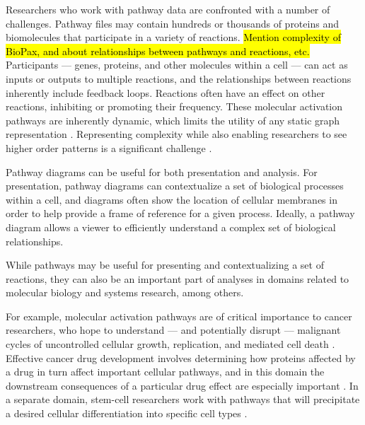 
Researchers who work with pathway data are confronted with a number of challenges.
Pathway files may contain hundreds or thousands of proteins and biomolecules that participate in a variety of reactions.
\hl{Mention complexity of BioPax, and about relationships between pathways and reactions, etc.}
Participants --- genes, proteins, and other molecules within a cell --- can act as inputs or outputs to multiple reactions, and the relationships between reactions inherently include feedback loops.
Reactions often have an effect on other reactions, inhibiting or promoting their frequency.
These molecular activation pathways are inherently dynamic, which limits the utility of any static graph representation \cite{kitano2002systems}.
Representing complexity while also enabling researchers to see higher order patterns is a significant challenge \cite{saraiya2005visualizing}.


Pathway diagrams can be useful for both presentation and analysis.
For presentation, pathway diagrams can contextualize a set of biological processes within a cell, and diagrams often show the location of cellular membranes in order to help provide a frame of reference for a given process.
Ideally, a pathway diagram allows a viewer to efficiently understand a complex set of biological relationships.


While pathways may be useful for presenting and contextualizing a set of reactions, they can also be an important part of analyses in domains related to molecular biology and systems research, among others.

For example, molecular activation pathways are of critical importance to cancer researchers, who hope to understand --- and potentially disrupt --- malignant cycles of uncontrolled cellular growth, replication, and mediated cell death \cite{cairns2011regulation}.
Effective cancer drug development involves determining how proteins affected by a drug in turn affect important cellular pathways, and in this domain the downstream consequences of a particular drug effect are especially important \cite{luo2003targeting}.
In a separate domain, stem-cell researchers work with pathways that will precipitate a desired cellular differentiation into specific cell types \cite{reya2001stem}.


